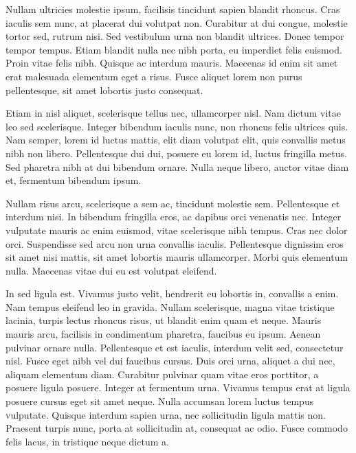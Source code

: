 \documentclass[conference]{IEEEtran}
\begin{document}
Nullam ultricies molestie ipsum, facilisis tincidunt sapien blandit rhoncus. Cras iaculis sem nunc, at placerat dui volutpat non. Curabitur at dui congue, molestie tortor sed, rutrum nisi. Sed vestibulum urna non blandit ultrices. Donec tempor tempor tempus. Etiam blandit nulla nec nibh porta, eu imperdiet felis euismod. Proin vitae felis nibh. Quisque ac interdum mauris. Maecenas id enim sit amet erat malesuada elementum eget a risus. Fusce aliquet lorem non purus pellentesque, sit amet lobortis justo consequat.

Etiam in nisl aliquet, scelerisque tellus nec, ullamcorper nisl. Nam dictum vitae leo sed scelerisque. Integer bibendum iaculis nunc, non rhoncus felis ultrices quis. Nam semper, lorem id luctus mattis, elit diam volutpat elit, quis convallis metus nibh non libero. Pellentesque dui dui, posuere eu lorem id, luctus fringilla metus. Sed pharetra nibh at dui bibendum ornare. Nulla neque libero, auctor vitae diam et, fermentum bibendum ipsum.

Nullam risus arcu, scelerisque a sem ac, tincidunt molestie sem. Pellentesque et interdum nisi. In bibendum fringilla eros, ac dapibus orci venenatis nec. Integer vulputate mauris ac enim euismod, vitae scelerisque nibh tempus. Cras nec dolor orci. Suspendisse sed arcu non urna convallis iaculis. Pellentesque dignissim eros sit amet nisi mattis, sit amet lobortis mauris ullamcorper. Morbi quis elementum nulla. Maecenas vitae dui eu est volutpat eleifend.

In sed ligula est. Vivamus justo velit, hendrerit eu lobortis in, convallis a enim. Nam tempus eleifend leo in gravida. Nullam scelerisque, magna vitae tristique lacinia, turpis lectus rhoncus risus, ut blandit enim quam et neque. Mauris mauris arcu, facilisis in condimentum pharetra, faucibus eu ipsum. Aenean pulvinar ornare nulla. Pellentesque et est iaculis, interdum velit sed, consectetur nisl. Fusce eget nibh vel dui faucibus cursus. Duis orci urna, aliquet a dui nec, aliquam elementum diam. Curabitur pulvinar quam vitae eros porttitor, a posuere ligula posuere. Integer at fermentum urna. Vivamus tempus erat at ligula posuere cursus eget sit amet neque. Nulla accumsan lorem luctus tempus vulputate. Quisque interdum sapien urna, nec sollicitudin ligula mattis non. Praesent turpis nunc, porta at sollicitudin at, consequat ac odio. Fusce commodo felis lacus, in tristique neque dictum a.
\end{document}
